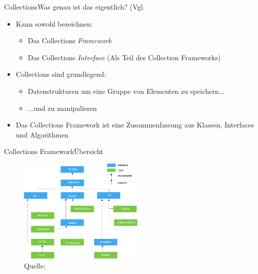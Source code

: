 \begin{frame}{Collections}{Was genau ist das eigentlich? (Vgl. \cite{collection1}}
    \begin{itemize}[<+->]
        \item Kann sowohl bezeichnen:
        \begin{itemize}
            \item Das Collections \textit{Framework}
            \item Das Collections \textit{Interface} (Als Teil des Collection Frameworks)
        \end{itemize}
        \item Collections sind grundlegend:
        \begin{itemize}
            \item Datenstrukturen um eine Gruppe von Elementen zu speichern...
            \item ...und zu manipulieren
        \end{itemize}
        \item Das Collections Framework ist eine Zusammenfassung aus Klassen, Interfaces und Algorithmen
    \end{itemize}
\end{frame}

\begin{frame}{Collections Framework}{Übersicht}
    \begin{figure}
    \centering
    \includegraphics[height=5cm]{graph/java-collection-hierarchy}
    \caption{Quelle: \cite{collection1}}
    \end{figure}
\end{frame}


